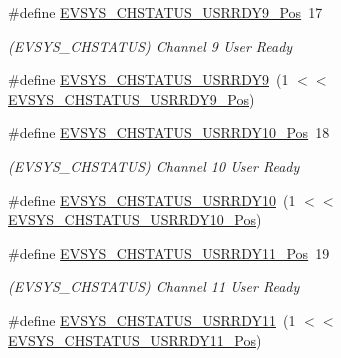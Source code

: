 \begin{DoxyCompactItemize}
\item 
\#define \mbox{\hyperlink{group___s_a_m_d21___e_v_s_y_s_ga23200e4a43d2c8ad259e115182188c29}{E\+V\+S\+Y\+S\+\_\+\+C\+H\+S\+T\+A\+T\+U\+S\+\_\+\+U\+S\+R\+R\+D\+Y9\+\_\+\+Pos}}~17
\begin{DoxyCompactList}\small\item\em (E\+V\+S\+Y\+S\+\_\+\+C\+H\+S\+T\+A\+T\+US) Channel 9 User Ready \end{DoxyCompactList}\item 
\#define \mbox{\hyperlink{group___s_a_m_d21___e_v_s_y_s_ga9c5e83a444e2bd5d32dcc6ab09d7bcd6}{E\+V\+S\+Y\+S\+\_\+\+C\+H\+S\+T\+A\+T\+U\+S\+\_\+\+U\+S\+R\+R\+D\+Y9}}~(1 $<$$<$ \mbox{\hyperlink{group___s_a_m_d21___e_v_s_y_s_ga23200e4a43d2c8ad259e115182188c29}{E\+V\+S\+Y\+S\+\_\+\+C\+H\+S\+T\+A\+T\+U\+S\+\_\+\+U\+S\+R\+R\+D\+Y9\+\_\+\+Pos}})
\item 
\#define \mbox{\hyperlink{group___s_a_m_d21___e_v_s_y_s_ga5c6977bb4bff519e09f9396b503c3ddc}{E\+V\+S\+Y\+S\+\_\+\+C\+H\+S\+T\+A\+T\+U\+S\+\_\+\+U\+S\+R\+R\+D\+Y10\+\_\+\+Pos}}~18
\begin{DoxyCompactList}\small\item\em (E\+V\+S\+Y\+S\+\_\+\+C\+H\+S\+T\+A\+T\+US) Channel 10 User Ready \end{DoxyCompactList}\item 
\#define \mbox{\hyperlink{group___s_a_m_d21___e_v_s_y_s_ga3dc3a404f657c2577b3805283b0b8a31}{E\+V\+S\+Y\+S\+\_\+\+C\+H\+S\+T\+A\+T\+U\+S\+\_\+\+U\+S\+R\+R\+D\+Y10}}~(1 $<$$<$ \mbox{\hyperlink{group___s_a_m_d21___e_v_s_y_s_ga5c6977bb4bff519e09f9396b503c3ddc}{E\+V\+S\+Y\+S\+\_\+\+C\+H\+S\+T\+A\+T\+U\+S\+\_\+\+U\+S\+R\+R\+D\+Y10\+\_\+\+Pos}})
\item 
\#define \mbox{\hyperlink{group___s_a_m_d21___e_v_s_y_s_ga60e1732a2b168f552835675148366176}{E\+V\+S\+Y\+S\+\_\+\+C\+H\+S\+T\+A\+T\+U\+S\+\_\+\+U\+S\+R\+R\+D\+Y11\+\_\+\+Pos}}~19
\begin{DoxyCompactList}\small\item\em (E\+V\+S\+Y\+S\+\_\+\+C\+H\+S\+T\+A\+T\+US) Channel 11 User Ready \end{DoxyCompactList}\item 
\#define \mbox{\hyperlink{group___s_a_m_d21___e_v_s_y_s_ga7373089eeb8cbb75056eaf9024ba72b8}{E\+V\+S\+Y\+S\+\_\+\+C\+H\+S\+T\+A\+T\+U\+S\+\_\+\+U\+S\+R\+R\+D\+Y11}}~(1 $<$$<$ \mbox{\hyperlink{group___s_a_m_d21___e_v_s_y_s_ga60e1732a2b168f552835675148366176}{E\+V\+S\+Y\+S\+\_\+\+C\+H\+S\+T\+A\+T\+U\+S\+\_\+\+U\+S\+R\+R\+D\+Y11\+\_\+\+Pos}})
\item 
$$
\end{DoxyCompactItemize}
